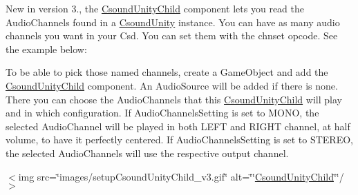 New in version 3., the \mbox{\hyperlink{class_csound_unity_child}{Csound\+Unity\+Child}} component lets you read the Audio\+Channels found in a \mbox{\hyperlink{class_csound_unity}{Csound\+Unity}} instance. You can have as many audio channels you want in your Csd. You can set them with the chnset opcode. See the example below\+: 
\begin{DoxyCode}{0}
\DoxyCodeLine{}
\DoxyCodeLine{}
\DoxyCodeLine{}

\end{DoxyCode}


To be able to pick those named channels, create a Game\+Object and add the \mbox{\hyperlink{class_csound_unity_child}{Csound\+Unity\+Child}} component. An Audio\+Source will be added if there is none. There you can choose the Audio\+Channels that this \mbox{\hyperlink{class_csound_unity_child}{Csound\+Unity\+Child}} will play and in which configuration. If Audio\+Channels\+Setting is set to MONO, the selected Audio\+Channel will be played in both LEFT and RIGHT channel, at half volume, to have it perfectly centered. If Audio\+Channels\+Setting is set to STEREO, the selected Audio\+Channels will use the respective output channel.

\texorpdfstring{$<$}{<}img src=\char`\"{}images/setup\+Csound\+Unity\+Child\+\_\+v3.\+gif\char`\"{} alt=\char`\"{}\char`\"{}\mbox{\hyperlink{class_csound_unity_child}{Csound\+Unity\+Child}}\char`\"{}\char`\"{}/\texorpdfstring{$>$}{>} 